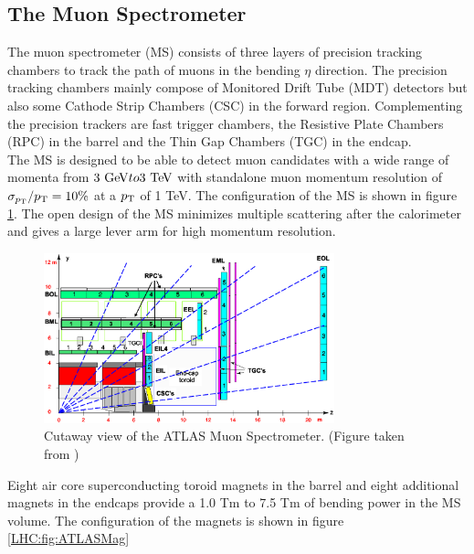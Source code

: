 \subsection{The Muon Spectrometer}
\label{LHC:MuonSpec}

\indent The muon spectrometer (MS) consists of three layers of precision tracking chambers to track the path of muons in the bending $\eta$ direction.  The precision tracking chambers mainly compose of Monitored Drift Tube (MDT) detectors but also some Cathode Strip Chambers (CSC) in the forward region.  Complementing the precision trackers are fast trigger chambers, the Resistive Plate Chambers (RPC) in the barrel and the Thin Gap Chambers (TGC) in the endcap. \\


\indent The MS is designed to be able to detect muon candidates with a wide range of momenta from $3 \gev to 3 \tev$ with standalone muon momentum resolution of $\sigma_{p_{\mathrm{T}}}/p_{\mathrm{T}} = 10\%$ at a $p_{\mathrm{T}}$ of 1 TeV.  The configuration of the MS is shown in figure \ref{LHC:fig:ATLASMuonSpec}.  The open design of the MS minimizes multiple scattering after the calorimeter and gives a large lever arm for high momentum resolution. ~\\

\begin{figure}[h!]
\centering
\includegraphics[width=0.75\textwidth, angle=0]{figures/LHC_ATLAS/Muon_rz_large_sect_6.eps}
\caption[Cutaway view of the ATLAS Muon Spectrometer]{ Cutaway view of the ATLAS Muon Spectrometer.  (Figure taken from \cite{ATLAS_JINST}) \label{LHC:fig:ATLASMuonSpec}}
\end{figure}

\indent Eight air core superconducting toroid magnets in the barrel and eight additional magnets in the endcaps provide a 1.0 Tm to 7.5 Tm of bending power in the MS volume. The configuration of the magnets is shown in figure \ref{LHC:fig:ATLASMag} ~\\

